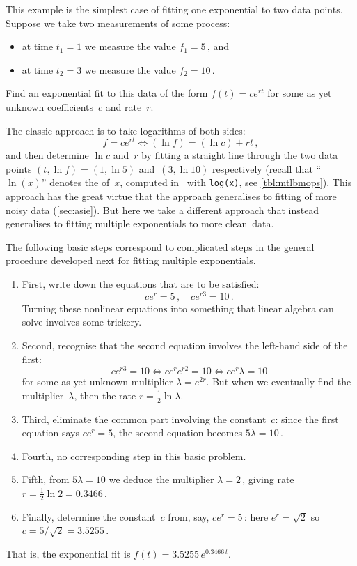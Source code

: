 \begin{example} \label{eg:eidd1}
This example is the simplest case of fitting one exponential to two data points.
Suppose we take two measurements of some process: 
\begin{itemize}
\item at time \(t_1=1\) we measure the value \(f_1=5\)\,, and 
\item at time \(t_2=3\) we measure the value \(f_2=10\)\,.
\end{itemize}
Find an exponential fit to this data of the form \(f(t)=ce^{rt}\) for some as yet unknown coefficients~\(c\) and rate~\(r\).
\begin{solution} 
The classic approach is to take logarithms of both sides:
\begin{equation*}
f=ce^{rt} \iff (\ln f)=(\ln c)+rt\,,
\end{equation*}
and then determine \(\ln c\) and~\(r\) by fitting a straight line through the two data points \((t,\ln f)=(1,\ln5)\) and~\((3,\ln10)\) respectively
(recall that ``\(\ln(x)\)'' denotes the  of~\(x\),  computed in \script\ with \verb|log(x)|, see \autoref{tbl:mtlbmops}).
This approach has the great virtue that the approach generalises to fitting of more noisy data (\autoref{sec:asie}).
But here we take a different approach that instead generalises to fitting multiple exponentials to more clean~data.

The following basic steps correspond to complicated steps in the general procedure developed next for fitting multiple exponentials.
\begin{enumerate}
\item First, write down the equations that are to be satisfied:
\begin{equation*}
ce^{r}=5\,,\quad ce^{r3}=10\,.
\end{equation*}
Turning these nonlinear equations into something that linear algebra  can solve involves some trickery.
\item Second, recognise that the second equation involves the left-hand side of the first:
\begin{equation*}
ce^{r3}=10 \iff ce^re^{r2}=10\iff ce^r\lambda=10
\end{equation*}
for some as yet unknown multiplier \(\lambda=e^{2r}\).
But when we eventually find the multiplier~\(\lambda\), then the rate \(r=\tfrac12\ln\lambda\).
\item Third, eliminate the common part involving the constant~\(c\): since the first equation says \(ce^r=5\), the second equation becomes \(5\lambda=10\)\,.
\item Fourth, no corresponding step in this basic problem.
\item Fifth, from \(5\lambda=10\) we deduce the multiplier \(\lambda=2\)\,, giving rate \(r=\tfrac12\ln 2=0.3466\)\,.
\item Finally, determine the constant~\(c\) from, say, \(ce^r=5\)\,:
here \(e^r=\sqrt2\) so \(c=5/\sqrt2=3.5255\)\,.
\end{enumerate}
That is, the exponential fit is \(f(t)=3.5255\,e^{0.3466\,t}\).
\end{solution}
\end{example}


